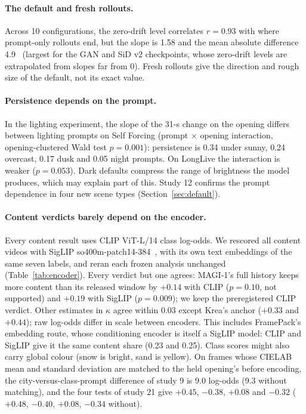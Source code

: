 \paragraph{The default and fresh rollouts.} Across 10 configurations, the zero-drift level correlates $r=0.93$ with
where prompt-only rollouts end, but the slope is 1.58 and the mean absolute difference 4.9~\Lstar{} (largest for the
GAN and SiD v2 checkpoints, whose zero-drift levels are extrapolated from slopes far from 0). Fresh rollouts give the
direction and rough size of the default, not its exact value.

\paragraph{Persistence depends on the prompt.} In the lighting experiment, the slope of the 31-s change on the
opening differs between lighting prompts on Self Forcing (prompt $\times$ opening interaction, opening-clustered Wald
test $p=0.001$): persistence is 0.34 under sunny, 0.24 overcast, 0.17 dusk and 0.05 night prompts. On LongLive the
interaction is weaker ($p=0.053$). Dark defaults compress the range of brightness the model produces, which may explain
part of this. Study 12 confirms the prompt dependence in four new scene types (Section~\ref{sec:default}).

\paragraph{Content verdicts barely depend on the encoder.} Every content result uses CLIP ViT-L/14 class log-odds. We
rescored all content videos with SigLIP so400m-patch14-384~\cite{siglip}, with its own text embeddings of the same seven
labels, and reran each frozen analysis unchanged (Table~\ref{tab:encoder}). Every verdict but one agrees: MAGI-1's full
history keeps more content than its released window by $+0.14$ with CLIP ($p=0.10$, not supported) and $+0.19$ with
SigLIP ($p=0.009$); we keep the preregistered CLIP verdict. Other estimates in $\kappa$ agree within 0.03 except Krea's anchor ($+0.33$ and $+0.44$); raw log-odds differ in scale between encoders. This includes FramePack's embedding route,
whose conditioning encoder is itself a SigLIP model: CLIP and SigLIP give it the same content share (0.23 and 0.25).
Class scores might also carry global colour (snow is bright, sand is yellow). On frames whose CIELAB mean and standard
deviation are matched to the held opening's before encoding, the city-versus-class-prompt difference of study 9 is 9.0
 log-odds (9.3 without matching), and the four tests of study 21 give $+0.45$, $-0.38$, $+0.08$ and $-0.32$
($+0.48$, $-0.40$, $+0.08$, $-0.34$ without).


